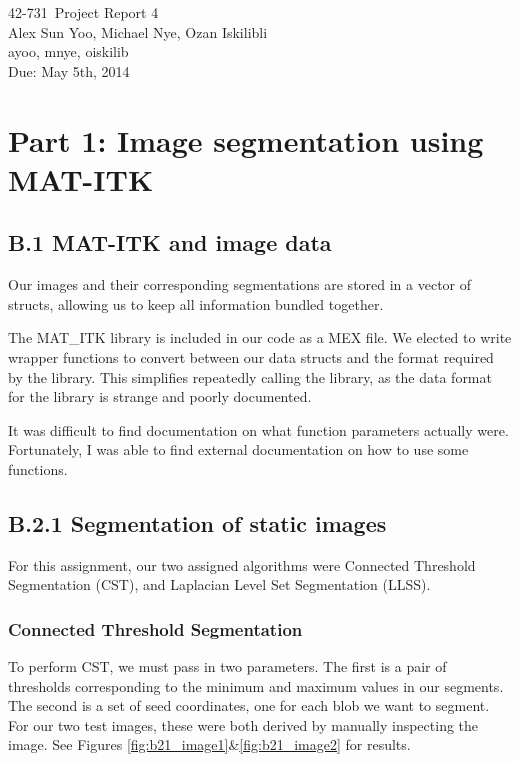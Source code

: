 \documentclass{article}
\newcommand{\hmwkTitle}{Project Report 4}
\newcommand{\hmwkDueDate}{May 5th, 2014}
\newcommand{\hmwkClass}{42-731}
\newcommand{\hmwkAuthor}{Alex Sun Yoo, Michael Nye, Ozan Iskilibli}
\newcommand{\hmwkEmail}{ayoo, mnye, oiskilib}
\newcommand{\hmwkCollaborators}{}
\begin{document}
\thispagestyle{plain}
\begin{center}
{\Large \hmwkClass\ \hmwkTitle} \\
\hmwkAuthor \\
\hmwkEmail \\
\ifthenelse{\equal{\hmwkCollaborators}{}}{}{Collaborators: \hmwkCollaborators\\}
Due: \hmwkDueDate\\
\end{center}

\section*{Part 1: Image segmentation using MAT-ITK}

\subsection*{B.1 MAT-ITK and image data}

Our images and their corresponding segmentations are stored in a vector of structs, allowing us to keep all information bundled together.

The MAT\_ITK library is included in our code as a MEX file. We elected to write wrapper functions to convert between our data structs and the format required by the library. This simplifies repeatedly calling the library, as the data format for the library is strange and poorly documented.

It was difficult to find documentation on what function parameters actually were. Fortunately, I was able to find external documentation on how to use some functions\cite{designest}.


\subsection*{B.2.1 Segmentation of static images}

For this assignment, our two assigned algorithms were Connected Threshold Segmentation (CST), and Laplacian Level Set Segmentation (LLSS).

\subsubsection*{Connected Threshold Segmentation}
To perform CST, we must pass in two parameters. The first is a pair of thresholds corresponding to the minimum and maximum values in our segments. The second is a set of seed coordinates, one for each blob we want to segment. For our two test images, these were both derived by manually inspecting the image. See Figures \ref{fig:b21_image1}\&\ref{fig:b21_image2} for results.
\end{document}
